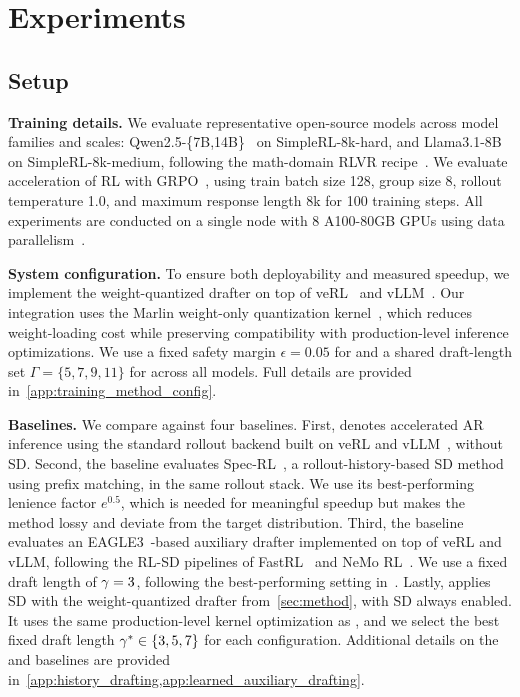 \section{Experiments}
\label{sec:Evaluation}

\subsection{Setup}
\label{sec:eval-setting}

\textbf{Training details.}
We evaluate representative open-source models across model families and scales: Qwen2.5-\{7B,14B\}~\citep{Yang2024Qwen25TR} on SimpleRL-8k-hard, and Llama3.1-8B~\citep{grattafiori2024llama} on SimpleRL-8k-medium, following the math-domain RLVR recipe~\citep{zeng2025simplerl}.
We evaluate acceleration of RL with GRPO~\citep{shao2024deepseekmath}, using train batch size 128, group size 8, rollout temperature 1.0, and maximum response length 8k for 100 training steps.
All experiments are conducted on a single node with 8 A100-80GB GPUs using data parallelism~\citep{shao2025beat}.

\textbf{System configuration.}
To ensure both deployability and measured speedup, we implement the weight-quantized drafter on top of veRL~\citep{sheng2025hybridflow} and vLLM~\citep{kwon2023efficient}.
Our integration uses the Marlin weight-only quantization kernel~\citep{frantar2025marlin}, which reduces weight-loading cost while preserving compatibility with production-level inference optimizations.
We use a fixed safety margin $\epsilon=0.05$ for \togglepolicy{} and a shared draft-length set $\Gamma=\{5,7,9,11\}$ for \adaptivepolicy{} across all models. Full details are provided in~\cref{app:training_method_config}.

\textbf{Baselines.}
We compare \methodtitle{} against four baselines.
First, \textbf{\nosd{}} denotes accelerated AR inference using the standard rollout backend built on veRL and vLLM~\citep{sheng2025hybridflow,kwon2023efficient}, without SD.
Second, the \textbf{\history{}} baseline evaluates Spec-RL~\citep{liu2025spec}, a rollout-history-based SD method using prefix matching, in the same rollout stack.
We use its best-performing lenience factor $e^{0.5}$, which is needed for meaningful speedup but makes the method lossy and deviate from the target distribution.
Third, the \textbf{\learned{}} baseline evaluates an EAGLE3~\citep{li2025eagle}-based auxiliary drafter implemented on top of veRL and vLLM, following the RL-SD pipelines of FastRL~\citep{hu2026taming} and NeMo RL~\citep{iso2026accelerating}.
We use a fixed draft length of $\gamma=3$, following the best-performing setting in~\citet{iso2026accelerating}.
Lastly, \textbf{\alwayssd{}} applies SD with the weight-quantized drafter from~\cref{sec:method}, with SD always enabled.
It uses the same production-level kernel optimization as \methodtitle{}, and we select the best fixed draft length $\gamma^{*} \in \{3,5,7\}$ for each configuration.
Additional details on the \history{} and \learned{} baselines are provided in~\cref{app:history_drafting,app:learned_auxiliary_drafting}.

